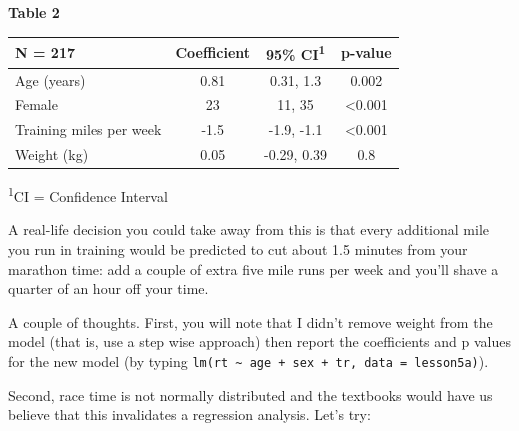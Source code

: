 \documentclass[]{book}
\newenvironment{Shaded}{\begin{snugshade}}{\end{snugshade}}
\newcommand{\DataTypeTok}[1]{\textcolor[rgb]{0.13,0.29,0.53}{#1}}
\newcommand{\KeywordTok}[1]{\textcolor[rgb]{0.13,0.29,0.53}{\textbf{#1}}}
\newcommand{\NormalTok}[1]{#1}
\newcommand{\OperatorTok}[1]{\textcolor[rgb]{0.81,0.36,0.00}{\textbf{#1}}}
\newcommand{\StringTok}[1]{\textcolor[rgb]{0.31,0.60,0.02}{#1}}
\begin{document}
\textbf{Table 2}

\captionsetup[table]{labelformat=empty,skip=1pt}
\begin{longtable}{lccc}
\toprule
\textbf{N = 217} & \textbf{Coefficient} & \textbf{95\% CI}\textsuperscript{1} & \textbf{p-value} \\ 
\midrule
Age (years) & 0.81 & 0.31, 1.3 & 0.002 \\ 
Female & 23 & 11, 35 & <0.001 \\ 
Training miles per week & -1.5 & -1.9, -1.1 & <0.001 \\ 
Weight (kg) & 0.05 & -0.29, 0.39 & 0.8 \\ 
\bottomrule
\end{longtable}
\vspace{-5mm}
\begin{minipage}{\linewidth}
\textsuperscript{1}CI = Confidence Interval \\ 
\end{minipage}

A real-life decision you could take away from this is that every additional mile you run in training would be predicted to cut about 1.5 minutes from your marathon time: add a couple of extra five mile runs per week and you'll shave a quarter of an hour off your time.

A couple of thoughts. First, you will note that I didn't remove weight from the model (that is, use a step wise approach) then report the coefficients and p values for the new model (by typing \texttt{lm(rt\ \textasciitilde{}\ age\ +\ sex\ +\ tr,\ data\ =\ lesson5a)}).

Second, race time is not normally distributed and the textbooks would have us believe that this invalidates a regression analysis. Let's try:

\begin{Shaded}
\end{Shaded}
\end{document}
